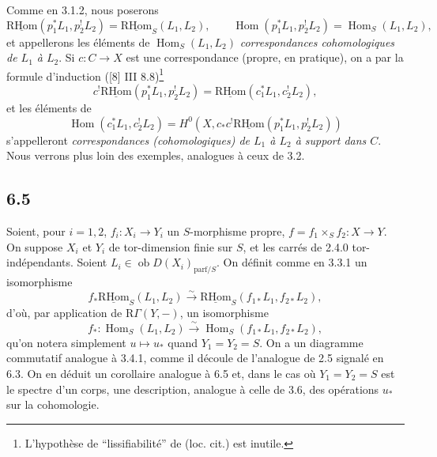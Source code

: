 \documentclass[11pt]{article}
\DeclareMathOperator{\Hom}{Hom}
\newcommand{\R}{\mathrm{R}}\newcommand{\RHomCore}{\mathrm{RHom}}
\providecommand{\RHom}{\RHomCore}
\providecommand{\uRHom}{\underline{\RHom}}
\providecommand{\RHom}{\RHomCore}
\providecommand{\Hom}{\operatorname{Hom}}
\providecommand{\RHom}{\R\mathcal{H}om}
\providecommand{\R}{\mathrm R}
\providecommand{\RHom}{\RHomCore}
\providecommand{\Hom}{\operatorname{Hom}}
\begin{document}
Comme en 3.1.2, nous poserons
\begin{equation}
\tag{6.4.3}
\uRHom(p_1^*L_1,p_2^!L_2)=\uRHom_S(L_1,L_2),\qquad
\Hom(p_1^*L_1,p_2^!L_2)=\Hom_S(L_1,L_2),
\end{equation}
et appellerons les éléments de $\Hom_S(L_1,L_2)$ \emph{correspondances cohomologiques de $L_1$ à $L_2$}. Si $c:C\to X$ est une correspondance (propre, en pratique), on a par la formule d'induction ([8] III 8.8)\footnote{L'hypothèse de ``lissifiabilité'' de (loc. cit.) est inutile.}
\begin{equation}
\tag{6.4.4}
c^!\uRHom(p_1^*L_1,p_2^!L_2)=\uRHom(c_1^*L_1,c_2^!L_2),
\end{equation}
et les éléments de
\[
\Hom(c_1^*L_1,c_2^!L_2)=H^0(X,c_*c^!\uRHom(p_1^*L_1,p_2^!L_2))
\]
s'appelleront \emph{correspondances (cohomologiques) de $L_1$ à $L_2$ à support dans $C$}. Nous verrons plus loin des exemples, analogues à ceux de 3.2.

\subsection*{6.5}
Soient, pour $i=1,2$, $f_i:X_i\to Y_i$ un $S$-morphisme propre, $f=f_1\times_Sf_2:X\to Y$. On suppose $X_i$ et $Y_i$ de tor-dimension finie sur $S$, et les carrés de 2.4.0 tor-indépendants. Soient $L_i\in\operatorname{ob}D(X_i)_{\mathrm{parf}/S}$. On définit comme en 3.3.1 un isomorphisme
\begin{equation}
\tag{6.5.1}
f_*\uRHom_S(L_1,L_2)\xrightarrow{\sim}\uRHom_S(f_{1*}L_1,f_{2*}L_2),
\end{equation}
d'où, par application de $\R\Gamma(Y,-)$, un isomorphisme
\begin{equation}
\tag{6.5.2}
f_*:\Hom_S(L_1,L_2)\xrightarrow{\sim}\Hom_S(f_{1*}L_1,f_{2*}L_2),
\end{equation}
qu'on notera simplement $u\mapsto u_*$ quand $Y_1=Y_2=S$. On a un diagramme commutatif analogue à 3.4.1, comme il découle de l'analogue de 2.5 signalé en 6.3. On en déduit un corollaire analogue à 6.5 et, dans le cas où $Y_1=Y_2=S$ est le spectre d'un corps, une description, analogue à celle de 3.6, des opérations $u_*$ sur la cohomologie.
\end{document}
